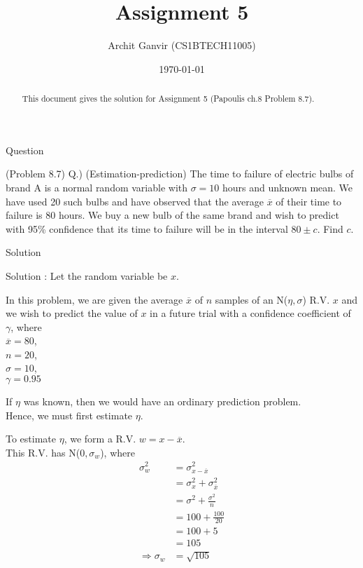 \documentclass{beamer}
\title{Assignment 5}
\author{Archit Ganvir (CS1BTECH11005)}
\date{\today}
\begin{document}
\providecommand{\brak}[1]{\ensuremath{\left(#1\right)}}
\begin{frame}

\titlepage

\begin{abstract}
This document gives the solution for Assignment 5 (Papoulis ch.8 Problem 8.7).
\end{abstract}

\end{frame}

\logo{}

\begin{frame}{Question}

(Problem 8.7) Q.) (Estimation-prediction) The time to failure of electric bulbs of brand A is a normal random variable with $\sigma = 10$ hours and unknown mean. We have used 20 such bulbs and have observed that the average $\overline{x}$ of their time to failure is 80 hours. We buy a new bulb of the same brand and wish to predict with 95\% confidence that its time to failure will be in the interval $80 \pm c$. Find $c$.

\end{frame}

\begin{frame}{Solution}

Solution : Let the random variable be $x$.

In this problem, we are given the average $\overline{x}$ of $n$ samples of an N($\eta, \sigma$) R.V. $x$ and we wish to predict the value of $x$ in a future trial with a confidence coefficient of $\gamma$, where\\
$\overline{x} = 80$,\\
$n = 20$,\\
$\sigma = 10$,\\
$\gamma = 0.95$

If $\eta$ was known, then we would have an ordinary prediction problem.\\
Hence, we must first estimate $\eta$.

\end{frame}

\begin{frame}

To estimate $\eta$, we form a R.V. $w = x - \overline{x}$.\\
This R.V. has N($0, \sigma _w$), where
\begin{align}
\sigma _w ^2 &= \sigma _{x - \overline{x}} ^2 \\
&= \sigma _x ^2 + \sigma _{\overline{x}} ^2 \\
&= \sigma ^2 + \frac{\sigma ^2}{n} \\
&= 100 + \frac{100}{20} \\
&= 100 + 5 \\
&= 105 \\
\Rightarrow \sigma _w &= \sqrt{105}
\end{align}

\end{frame}
\end{document}
